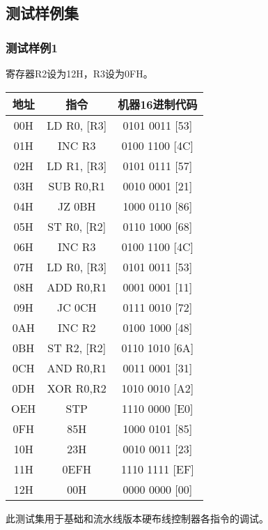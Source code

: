 \subsection{测试样例集}
\subsubsection{测试样例1}
寄存器R2设为12H，R3设为0FH。
\begin{table}[h]
    \centering
    \begin{tabular}[c]{|c|c|c|}
        \hline
        地址  & 指令          & 机器16进制代码       \\
        \hline
        00H & LD R0, [R3] & 0101 0011 [53] \\
        \hline
        01H & INC R3      & 0100 1100 [4C] \\
        \hline
        02H & LD R1, [R3] & 0101 0111 [57] \\
        \hline
        03H & SUB R0,R1   & 0010 0001 [21] \\
        \hline
        04H & JZ 0BH      & 1000 0110 [86] \\
        \hline
        05H & ST R0, [R2] & 0110 1000 [68] \\
        \hline
        06H & INC R3      & 0100 1100 [4C] \\
        \hline
        07H & LD R0, [R3] & 0101 0011 [53] \\
        \hline
        08H & ADD R0,R1   & 0001 0001 [11] \\
        \hline
        09H & JC 0CH      & 0111 0010 [72] \\
        \hline
        0AH & INC R2      & 0100 1000 [48] \\
        \hline
        0BH & ST R2, [R2] & 0110 1010 [6A] \\
        \hline
        0CH & AND R0,R1   & 0011 0001 [31] \\
        \hline
        0DH & XOR R0,R2   & 1010 0010 [A2] \\
        \hline
        OEH & STP         & 1110 0000 [E0] \\
        \hline
        0FH & 85H         & 1000 0101 [85] \\
        \hline
        10H & 23H         & 0010 0011 [23] \\
        \hline
        11H & 0EFH        & 1110 1111 [EF] \\
        \hline
        12H & 00H         & 0000 0000 [00] \\
        \hline
    \end{tabular}
\end{table}
此测试集用于基础和流水线版本硬布线控制器各指令的调试。

